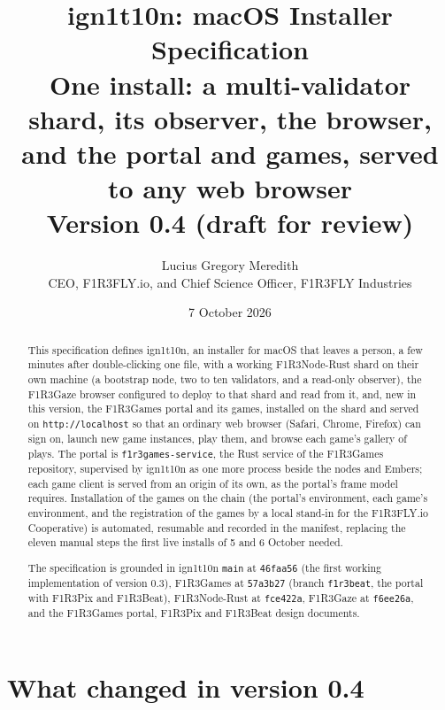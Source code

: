 \documentclass[11pt]{article}
\title{\textbf{ign1t10n: macOS Installer Specification}\\[4pt]
\large One install: a multi-validator \Nd{} shard, its observer, the \Gz{} browser,\\
and the \Gm{} portal and games, served to any web browser\\[6pt]
\normalsize Version 0.4 (draft for review)}
\author{Lucius Gregory Meredith\\
\small CEO, F1R3FLY.io, and Chief Science Officer, F1R3FLY Industries}
\date{7 October 2026}
\theoremstyle{definition}
\theoremstyle{remark}
\newcommand{\code}[1]{\texttt{#1}}
\newcommand{\Gz}{F1R3Gaze}
\newcommand{\Hr}{ign1t10n}
\newcommand{\Nd}{F1R3Node-Rust}
\newcommand{\Gm}{F1R3Games}
\newcommand{\Svc}{\code{f1r3games-service}}
\newcommand{\Em}{Embers}
\begin{document}
\maketitle

\begin{abstract}
\noindent
This specification defines \Hr{}, an installer for macOS that leaves a person, a
few minutes after double-clicking one file, with a working \Nd{} shard on their own
machine (a bootstrap node, two to ten validators, and a read-only observer), the
\Gz{} browser configured to deploy to that shard and read from it, and, new in this
version, the \Gm{} portal and its games, installed on the shard and served on
\code{http://localhost} so that an ordinary web browser (Safari, Chrome, Firefox) can
sign on, launch new game instances, play them, and browse each game's gallery of
plays. The portal is \Svc{}, the Rust service of the \Gm{} repository, supervised by
\Hr{} as one more process beside the nodes and \Em{}; each game client is served from
an origin of its own, as the portal's frame model requires. Installation of the games
on the chain (the portal's environment, each game's environment, and the
registration of the games by a local stand-in for the F1R3FLY.io Cooperative) is
automated, resumable and recorded in the manifest, replacing the eleven manual steps
the first live installs of 5 and 6 October needed.

The specification is grounded in \Hr{} \code{main} at \code{46faa56} (the first
working implementation of version 0.3), \Gm{} at \code{57a3b27} (branch
\code{f1r3beat}, the portal with F1R3Pix and F1R3Beat), \Nd{} at \code{fce422a},
\Gz{} at \code{f6ee26a}, and the \Gm{} portal, F1R3Pix and F1R3Beat design documents.
\end{abstract}

\tableofcontents
\newpage

\section{What changed in version 0.4}\label{sec:changes}
\end{document}
